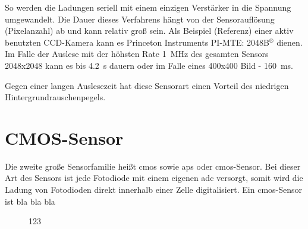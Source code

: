 \noindent
So werden die Ladungen seriell mit einem einzigen Verstärker in die Spannung umgewandelt. Die Dauer dieses Verfahrens hängt von der Sensorauflösung (Pixelanzahl) ab und kann relativ groß sein. Als Beispiel (Referenz) einer aktiv benutzten CCD-Kamera kann es Princeton Instruments
PI-MTE: 2048B$^{\text{®}}$ dienen. Im Falle der Auslese mit der höhsten Rate \SI{1}{\mega\hertz} \cite[s. 81, Readout charakterstik]{mte-manual} des gesamten Sensors 2048x2048 kann es bis \SI{4,2}{\second} dauern oder im Falle eines 400x400 Bild - \SI{160}{\milli\second}. 

\noindent
Gegen einer langen Auslesezeit hat diese Sensorart einen Vorteil des niedrigen Hintergrundrauschenpegels.

\section{CMOS-Sensor}
Die zweite große Sensorfamilie heißt \gls{cmos} sowie \gls{aps} oder \gls{cmos}-Sensor. Bei dieser Art des Sensors ist jede Fotodiode mit einem eigenen \gls{adc} versorgt, somit wird die Ladung von Fotodioden direkt innerhalb einer Zelle digitalisiert. 
Ein \gls{cmos}-Sensor ist bla bla bla
\begin{figure}[H]
    \centering
    \hfill
    \hfill
    \caption{123}
    \label{fig:cmos_scheme}
\end{figure}


